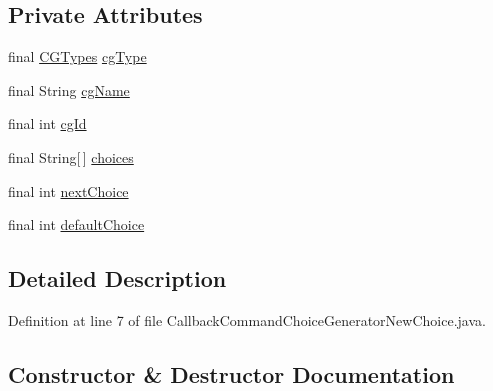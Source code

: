 \subsection*{Private Attributes}
\begin{DoxyCompactItemize}
\item 
final \hyperlink{enumgov_1_1nasa_1_1jpf_1_1inspector_1_1interfaces_1_1_choice_generators_interface_1_1_c_g_types}{C\+G\+Types} \hyperlink{classgov_1_1nasa_1_1jpf_1_1inspector_1_1server_1_1callbacks_1_1commands_1_1_callback_command_choice_generator_new_choice_aef88e25106f1e63e6f8d6f598361c7c2}{cg\+Type}
\item 
final String \hyperlink{classgov_1_1nasa_1_1jpf_1_1inspector_1_1server_1_1callbacks_1_1commands_1_1_callback_command_choice_generator_new_choice_a62966867f2d4ac68f8b3aee99d656705}{cg\+Name}
\item 
final int \hyperlink{classgov_1_1nasa_1_1jpf_1_1inspector_1_1server_1_1callbacks_1_1commands_1_1_callback_command_choice_generator_new_choice_a797f09a910d1b8c7c90e0bc97a9a4e30}{cg\+Id}
\item 
final String\mbox{[}$\,$\mbox{]} \hyperlink{classgov_1_1nasa_1_1jpf_1_1inspector_1_1server_1_1callbacks_1_1commands_1_1_callback_command_choice_generator_new_choice_afaefb79793bcee2bbcaa6ea0e69231a8}{choices}
\item 
final int \hyperlink{classgov_1_1nasa_1_1jpf_1_1inspector_1_1server_1_1callbacks_1_1commands_1_1_callback_command_choice_generator_new_choice_acd76b0a631b4006a246c68bb3d3f6dea}{next\+Choice}
\item 
final int \hyperlink{classgov_1_1nasa_1_1jpf_1_1inspector_1_1server_1_1callbacks_1_1commands_1_1_callback_command_choice_generator_new_choice_ab6b050dd3c0d12016f8a88f13b0b64fb}{default\+Choice}
\end{DoxyCompactItemize}


\subsection{Detailed Description}


Definition at line 7 of file Callback\+Command\+Choice\+Generator\+New\+Choice.\+java.



\subsection{Constructor \& Destructor Documentation}
